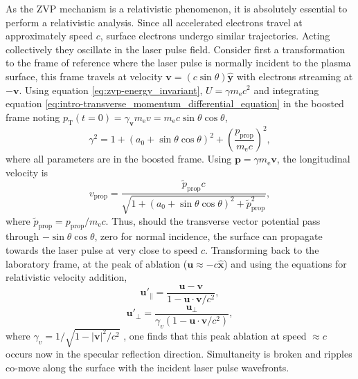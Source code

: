 As the \ac{ZVP} mechanism is a relativistic phenomenon, it is absolutely essential to perform a relativistic analysis. Since all accelerated electrons travel at approximately speed $c$, surface electrons undergo similar trajectories. Acting collectively they oscillate in the laser pulse field. Consider first a transformation to the frame of reference where the laser pulse is normally incident to the plasma surface, this frame travels at velocity $\mathbf{v} = (c\sin\theta )\hat{\mathbf{y}}$ with electrons streaming at $-\mathbf{v}$. 
Using equation \ref{eq:zvp-energy_invariant}, $U = \gamma m_\mathrm{e} c^2$ and integrating equation \ref{eq:intro-transverse_momentum_differential_equation} in the boosted frame noting $p_\mathrm{T}(t=0) = \gamma_\mathbf{v} m_\mathrm{e}v =m_\mathrm{e}c \sin\theta\cos\theta$,
\begin{equation}
	\gamma^2 = 1 + (a_0 + \sin\theta\cos\theta)^2 + \left(\frac{p_\mathrm{prop}}{m_\mathrm{e}c}\right)^2,
\end{equation}
where all parameters are in the boosted frame. Using $\mathbf{p} = \gamma m_\mathrm{e} \mathbf{v}$, the longitudinal velocity is
\begin{equation}
	v_\mathrm{prop} = \frac{\tilde{p}_\mathrm{prop}c}{\sqrt{1 + (a_0 + \sin\theta\cos\theta)^2 + \tilde{p}^2_\mathrm{prop}}},
\end{equation}
where $\tilde{p}_\mathrm{prop} = p_\mathrm{prop}/m_\mathrm{e}c$. Thus, should the transverse vector potential pass through $-\sin\theta\cos\theta$, zero for normal incidence, the surface can propagate towards the laser pulse at very close to speed $c$. Transforming back to the laboratory frame, at the peak of ablation ($\mathbf{u}\approx -c\hat{\mathbf{x}}$) and using the equations for relativistic velocity addition,
\begin{equation}\label{eq:zvp_velocityaddition1}
	\mathbf{u}'_{\|} = \frac{\mathbf{u}-\mathbf{v}}{1- \mathbf{u}\cdot\mathbf{v}/c^2},
\end{equation}
\begin{equation}\label{eq:zvp_velocityaddition2}
	\mathbf{u}'_{\perp} = \frac{\mathbf{u}_\perp}{\gamma_v(1- \mathbf{u}\cdot\mathbf{v}/c^2)},
\end{equation}
where $\gamma_v = 1/\sqrt{1-|\mathbf{v}|^2/c^2}$ \cite{steaneRelativityMadeRelatively2012}, one finds that this peak ablation at speed $\approx c$ occurs now in the specular reflection direction. Simultaneity is broken and ripples co-move along the surface with the incident laser pulse wavefronts.

